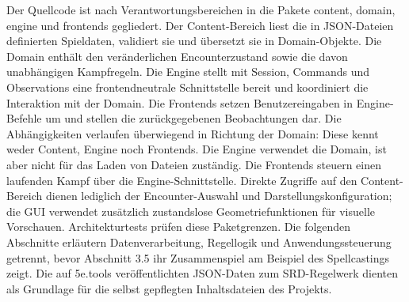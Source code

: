 {}
\markdownRendererSectionEnd \markdownRendererSectionBegin
{}\markdownRendererInterblockSeparator
{}\markdownRendererSectionBegin
{}\markdownRendererInterblockSeparator
{}Der Quellcode ist nach Verantwortungsbereichen in die Pakete content, domain, engine und frontends gegliedert. Der Content-Bereich liest die in JSON-Dateien definierten Spieldaten, validiert sie und übersetzt sie in Domain-Objekte. Die Domain enthält den veränderlichen Encounterzustand sowie die davon unabhängigen Kampfregeln. Die Engine stellt mit Session, Commands und Observations eine frontendneutrale Schnittstelle bereit und koordiniert die Interaktion mit der Domain. Die Frontends setzen Benutzereingaben in Engine-Befehle um und stellen die zurückgegebenen Beobachtungen dar.\markdownRendererSoftLineBreak
{}Die Abhängigkeiten verlaufen überwiegend in Richtung der Domain: Diese kennt weder Content, Engine noch Frontends. Die Engine verwendet die Domain, ist aber nicht für das Laden von Dateien zuständig. Die Frontends steuern einen laufenden Kampf über die Engine-Schnittstelle. Direkte Zugriffe auf den Content-Bereich dienen lediglich der Encounter-Auswahl und Darstellungskonfiguration; die GUI verwendet zusätzlich zustandslose Geometriefunktionen für visuelle Vorschauen. Architekturtests prüfen diese Paketgrenzen. Die folgenden Abschnitte erläutern Datenverarbeitung, Regellogik und Anwendungssteuerung getrennt, bevor Abschnitt 3.5 ihr Zusammenspiel am Beispiel des Spellcastings zeigt.\markdownRendererParagraphSeparator
{}\markdownRendererInterblockSeparator
{}
\markdownRendererSectionEnd \markdownRendererSectionBegin
{}\markdownRendererInterblockSeparator
{}Die auf 5e.tools veröffentlichten JSON-Daten zum SRD-Regelwerk dienten als Grundlage für die selbst gepflegten Inhaltsdateien des Projekts.\markdownRendererParagraphSeparator
{}\markdownRendererInterblockSeparator
